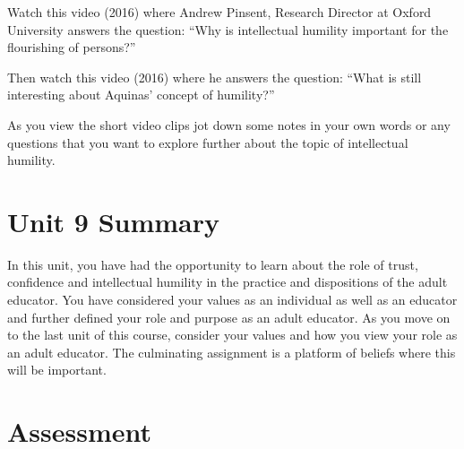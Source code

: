 \documentclass[
]{book}
\begin{document}
\begin{video}
Watch this video (2016) where Andrew Pinsent, Research Director at
Oxford University answers the question: ``Why is intellectual humility
important for the flourishing of persons?''

Then watch this video (2016) where he answers the question: ``What is
still interesting about Aquinas' concept of humility?''

As you view the short video clips jot down some notes in your own words
or any questions that you want to explore further about the topic of
intellectual humility.
\end{video}

\hypertarget{unit-9-summary}{%
\section*{Unit 9 Summary}\label{unit-9-summary}}

In this unit, you have had the opportunity to learn about the role of trust, confidence and intellectual humility in the practice and dispositions of the adult educator. You have considered your values as an individual as well as an educator and further defined your role and purpose as an adult educator. As you move on to the last unit of this course, consider your values and how you view your role as an adult educator. The culminating assignment is a platform of beliefs where this will be important.

\hypertarget{assessment-8}{%
\section*{Assessment}\label{assessment-8}}
\end{document}
